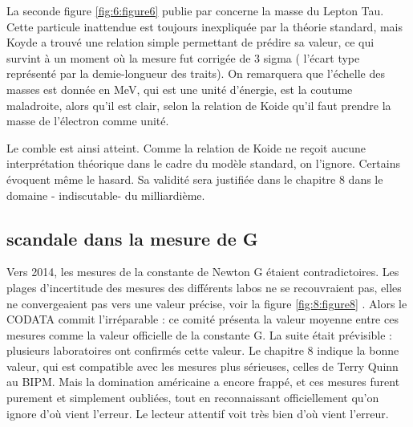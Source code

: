 \documentclass[a4paper,12pt]{article}
\begin{document}
La seconde figure \ref{fig:6:figure6} publie par \cite{Tanabashi} concerne la masse du Lepton Tau. Cette particule inattendue est toujours inexpliquée par la théorie standard, mais Koyde a trouvé une relation simple permettant de prédire sa valeur, ce qui survint à un moment où la mesure fut corrigée de 3 sigma ( l’écart type représenté par la demie-longueur des traits). On remarquera que l’échelle des masses est donnée en MeV, qui est une unité d’énergie, est la coutume maladroite, alors qu’il est clair, selon la relation de Koide qu’il faut prendre la masse de l’électron comme unité. 

Le comble est ainsi atteint. Comme la relation de Koide ne reçoit aucune interprétation théorique dans le cadre du modèle standard, on l’ignore. Certains évoquent même le hasard. Sa validité sera justifiée dans le chapitre 8 dans le domaine - indiscutable- du milliardième. 



\subsection {scandale dans la mesure de G}
Vers 2014, les mesures de la constante de Newton G étaient contradictoires. Les plages d’incertitude des mesures des différents labos ne se recouvraient pas, elles ne convergeaient pas vers une valeur précise, voir la figure \ref{fig:8:figure8} \cite{Wu}.
 Alors le CODATA commit l’irréparable : ce comité présenta la valeur moyenne entre ces mesures comme la valeur officielle de la constante G.
La suite était prévisible : plusieurs laboratoires ont confirmés cette valeur. Le chapitre 8 indique la bonne valeur, qui est compatible avec les mesures plus sérieuses, celles de Terry Quinn au BIPM. Mais la domination américaine a encore frappé, et ces mesures furent purement et simplement oubliées, tout en reconnaissant officiellement qu’on ignore d’où vient l’erreur.
Le lecteur attentif voit très bien d’où vient l’erreur. 
\end{document}
